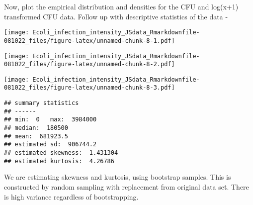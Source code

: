 \documentclass[
]{article}
\newenvironment{Shaded}{\begin{snugshade}}{\end{snugshade}}
\newcommand{\AttributeTok}[1]{\textcolor[rgb]{0.77,0.63,0.00}{#1}}
\newcommand{\CommentTok}[1]{\textcolor[rgb]{0.56,0.35,0.01}{\textit{#1}}}
\newcommand{\ConstantTok}[1]{\textcolor[rgb]{0.00,0.00,0.00}{#1}}
\newcommand{\DecValTok}[1]{\textcolor[rgb]{0.00,0.00,0.81}{#1}}
\newcommand{\FunctionTok}[1]{\textcolor[rgb]{0.00,0.00,0.00}{#1}}
\newcommand{\NormalTok}[1]{#1}
\newcommand{\SpecialCharTok}[1]{\textcolor[rgb]{0.00,0.00,0.00}{#1}}
\begin{document}
Now, plot the empirical distribution and densities for the CFU and
log(x+1) transformed CFU data. Follow up with descriptive statistics of
the data -

\begin{Shaded}
\end{Shaded}

\texttt{[image: Ecoli\_infection\_intensity\_JSdata\_Rmarkdownfile-081022\_files/figure-latex/unnamed-chunk-8-1.pdf]}

\begin{Shaded}
\end{Shaded}

\texttt{[image: Ecoli\_infection\_intensity\_JSdata\_Rmarkdownfile-081022\_files/figure-latex/unnamed-chunk-8-2.pdf]}

\begin{Shaded}
\end{Shaded}

\texttt{[image: Ecoli\_infection\_intensity\_JSdata\_Rmarkdownfile-081022\_files/figure-latex/unnamed-chunk-8-3.pdf]}

\begin{verbatim}
## summary statistics
## ------
## min:  0   max:  3984000 
## median:  180500 
## mean:  681923.5 
## estimated sd:  906744.2 
## estimated skewness:  1.431304 
## estimated kurtosis:  4.26786
\end{verbatim}

We are estimating skewness and kurtosis, using bootstrap samples. This
is constructed by random sampling with replacement from original data
set. There is high variance regardless of bootstrapping.
\end{document}
